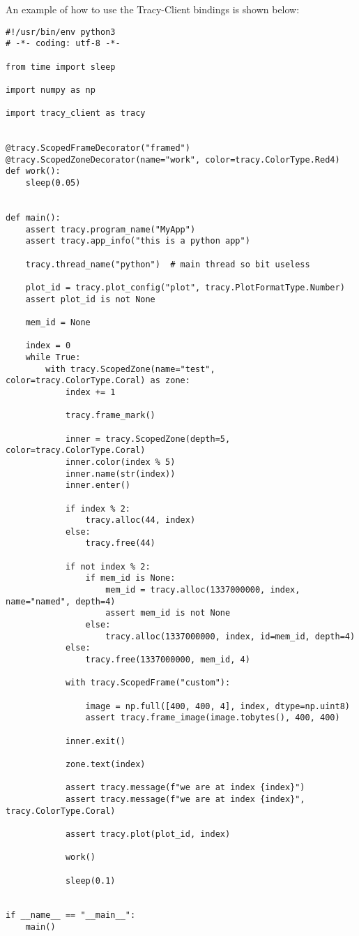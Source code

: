 \documentclass[hidelinks,titlepage,a4paper,twoside]{article}
\begin{document}
An example of how to use the Tracy-Client bindings is shown below:

\begin{lstlisting}
#!/usr/bin/env python3
# -*- coding: utf-8 -*-

from time import sleep

import numpy as np

import tracy_client as tracy


@tracy.ScopedFrameDecorator("framed")
@tracy.ScopedZoneDecorator(name="work", color=tracy.ColorType.Red4)
def work():
    sleep(0.05)


def main():
    assert tracy.program_name("MyApp")
    assert tracy.app_info("this is a python app")

    tracy.thread_name("python")  # main thread so bit useless

    plot_id = tracy.plot_config("plot", tracy.PlotFormatType.Number)
    assert plot_id is not None

    mem_id = None

    index = 0
    while True:
        with tracy.ScopedZone(name="test", color=tracy.ColorType.Coral) as zone:
            index += 1

            tracy.frame_mark()

            inner = tracy.ScopedZone(depth=5, color=tracy.ColorType.Coral)
            inner.color(index % 5)
            inner.name(str(index))
            inner.enter()

            if index % 2:
                tracy.alloc(44, index)
            else:
                tracy.free(44)

            if not index % 2:
                if mem_id is None:
                    mem_id = tracy.alloc(1337000000, index, name="named", depth=4)
                    assert mem_id is not None
                else:
                    tracy.alloc(1337000000, index, id=mem_id, depth=4)
            else:
                tracy.free(1337000000, mem_id, 4)

            with tracy.ScopedFrame("custom"):

                image = np.full([400, 400, 4], index, dtype=np.uint8)
                assert tracy.frame_image(image.tobytes(), 400, 400)

            inner.exit()

            zone.text(index)

            assert tracy.message(f"we are at index {index}")
            assert tracy.message(f"we are at index {index}", tracy.ColorType.Coral)

            assert tracy.plot(plot_id, index)

            work()

            sleep(0.1)


if __name__ == "__main__":
    main()
\end{lstlisting}
\end{document}
